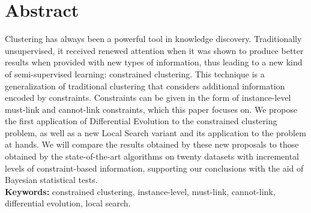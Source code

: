 \begingroup

\chapter*{Abstract}

Clustering has always been a powerful tool in knowledge discovery. Traditionally unsupervised, it received renewed attention when it was shown to produce better results when provided with new types of information, thus leading to a new kind of semi-supervised learning: constrained clustering. This technique is a generalization of traditional clustering that considers additional information encoded by constraints. Constraints can be given in the form of instance-level must-link and cannot-link constraints, which this paper focuses on. We propose the first application of Differential Evolution to the constrained clustering problem, as well as a new Local Search variant and its application to the problem at hands. We will compare the results obtained by these new proposals to those obtained by the state-of-the-art algorithms on twenty datasets with incremental levels of constraint-based information, supporting our conclusions with the aid of Bayesian statistical tests.\\ 


\noindent\textbf{Keywords:} constrained clustering, instance-level, must-link, cannot-link, differential evolution, local search.


\endgroup